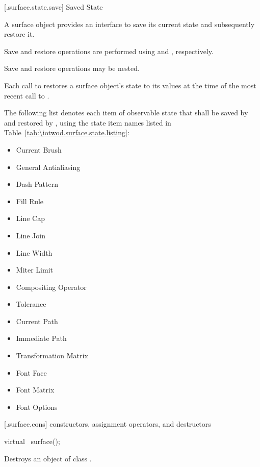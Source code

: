 [\iotwod.surface.state.save] { Saved State}

\pnum
A surface object provides an interface to save its current state and subsequently restore it.

\pnum
Save and restore operations are performed using  and , respectively.

\pnum
Save and restore operations may be nested.

\pnum
Each call to  restores a surface object's state to its values at the time of the most recent call to .

\pnum
The following list denotes each item of observable state that shall be saved by  and restored by , using the state item names listed in Table~\ref{tab:\iotwod.surface.state.listing}:

\begin{itemize}
	\item Current Brush
	\item General Antialiasing
	\item Dash Pattern
	\item Fill Rule
	\item Line Cap
	\item Line Join
	\item Line Width
	\item Miter Limit
	\item Compositing Operator
	\item Tolerance
	\item Current Path
	\item Immediate Path
	\item Transformation Matrix
	\item Font Face
	\item Font Matrix
	\item Font Options
\end{itemize}


 [\iotwod.surface.cons] { constructors, assignment operators, and destructors}

\begin{itemdecl}
virtual ~surface();
\end{itemdecl}
\begin{itemdescr}
	\pnum
	\effects
	Destroys an object of class .
	
\end{itemdescr}

